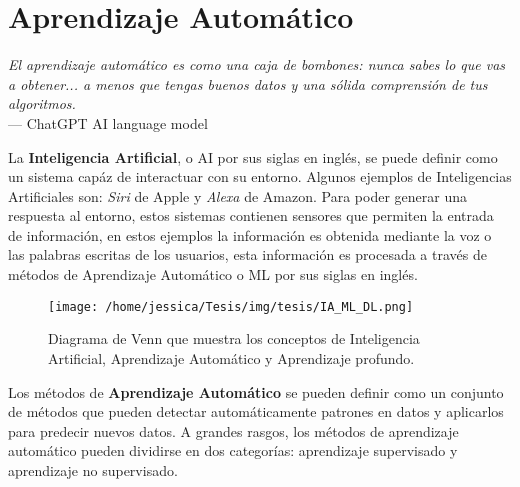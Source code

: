 \chapter{Aprendizaje Automático}\label{ch:ML}
\begin{flushright}{\slshape
    El aprendizaje automático es como una caja de bombones: nunca sabes lo que vas a obtener... a menos que tengas buenos datos y una sólida comprensión de tus algoritmos.} \\ \medskip
    --- ChatGPT AI language model
\end{flushright}



La \textbf{Inteligencia Artificial}, o AI por sus siglas en inglés, se puede definir como un sistema capáz de interactuar con su entorno. Algunos ejemplos de Inteligencias Artificiales son: \emph{Siri} de Apple y \emph{Alexa} de Amazon. Para poder generar una respuesta al entorno, estos sistemas contienen sensores que permiten la entrada de información, en estos ejemplos la información es obtenida mediante la voz o las palabras escritas de los usuarios, esta información es procesada a través de métodos de Aprendizaje Automático o ML por sus siglas en inglés.

\begin{figure}[!htbp]
  \centering
  \texttt{[image: /home/jessica/Tesis/img/tesis/IA\_ML\_DL.png]}
  \caption{Diagrama de Venn que muestra los conceptos de Inteligencia Artificial, Aprendizaje Automático y Aprendizaje profundo.}
  \label{fig:IA-ML-DL}
\end{figure}

Los métodos de \textbf{Aprendizaje Automático} se pueden definir como un conjunto de métodos que pueden detectar automáticamente patrones en datos y aplicarlos para predecir nuevos datos. A grandes rasgos, los métodos de aprendizaje automático pueden dividirse en dos categorías: aprendizaje supervisado y aprendizaje no supervisado. \cite{murphy:2013}

